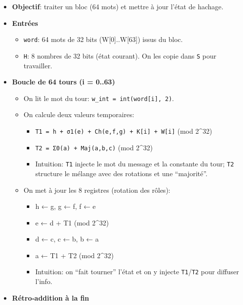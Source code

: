 \documentclass[11pt]{article}
\providecommand{\tightlist}{%
      \setlength{\itemsep}{0pt}\setlength{\parskip}{0pt}}
\begin{document}
\begin{itemize}
\item
  \textbf{Objectif}: traiter un bloc (64 mots) et mettre à jour l'état
  de hachage.
\item
  \textbf{Entrées}

  \begin{itemize}
  \tightlist
  \item
    \texttt{word}: 64 mots de 32 bits (W{[}0{]}..W{[}63{]}) issus du
    bloc.
  \item
    \texttt{H}: 8 nombres de 32 bits (état courant). On les copie dans
    \texttt{S} pour travailler.
  \end{itemize}
\item
  \textbf{Boucle de 64 tours (i = 0..63)}

  \begin{itemize}
  \tightlist
  \item
    On lit le mot du tour: \texttt{w\_int\ =\ int(word{[}i{]},\ 2)}.
  \item
    On calcule deux valeurs temporaires:

    \begin{itemize}
    \tightlist
    \item
      \texttt{T1\ =\ h\ +\ σ1(e)\ +\ Ch(e,f,g)\ +\ K{[}i{]}\ +\ W{[}i{]}}
      (mod 2\^{}32)
    \item
      \texttt{T2\ =\ Σ0(a)\ +\ Maj(a,b,c)} (mod 2\^{}32)
    \item
      Intuition: \texttt{T1} injecte le mot du message et la constante
      du tour; \texttt{T2} structure le mélange avec des rotations et
      une ``majorité''.
    \end{itemize}
  \item
    On met à jour les 8 registres (rotation des rôles):

    \begin{itemize}
    \tightlist
    \item
      h ← g, g ← f, f ← e
    \item
      e ← d + T1 (mod 2\^{}32)
    \item
      d ← c, c ← b, b ← a
    \item
      a ← T1 + T2 (mod 2\^{}32)
    \item
      Intuition: on ``fait tourner'' l'état et on y injecte
      \texttt{T1}/\texttt{T2} pour diffuser l'info.
    \end{itemize}
  \end{itemize}
\item
  \textbf{Rétro‑addition à la fin}


\end{itemize}
\end{document}
